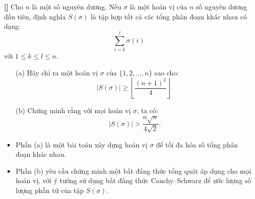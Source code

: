 \documentclass[../03-arithmetic-functions.tex]{subfiles}
\begin{document}
\begin{exercise*}\label{example:ROU-2015-TST-D4-P2}\textbf{[]}
    Cho \( n \) là một số nguyên dương. Nếu \( \sigma \) là một hoán vị của \( n \) số nguyên dương đầu tiên,
    định nghĩa \( S(\sigma) \) là tập hợp tất cả các tổng phân đoạn khác nhau có dạng:
    \[
        \sum_{i=k}^{l} \sigma(i)
    \]
    với \( 1 \le k \le l \le n \).
    
    \begin{itemize}[topsep=0pt, partopsep=0pt, itemsep=0pt]
        \item[(a)] Hãy chỉ ra một hoán vị \( \sigma \) của \( \{1, 2, \ldots, n\} \) sao cho:
        \[
            |S(\sigma)| \geq \left\lfloor \frac{(n+1)^2}{4} \right\rfloor.
        \]
        \item[(b)] Chứng minh rằng với mọi hoán vị \( \sigma \), ta có:
        \[
            |S(\sigma)| > \frac{n\sqrt{n}}{4\sqrt{2}}.
        \]
    \end{itemize}
\end{exercise*}

\begin{remark*}
    \begin{itemize}[topsep=0pt, partopsep=0pt, itemsep=0pt]
        \item Phần (a) là một bài toán xây dựng hoán vị \(\sigma\) để tối đa hóa số tổng phân đoạn khác nhau.
        \item Phần (b) yêu cầu chứng minh một bất đẳng thức tổng quát áp dụng cho mọi hoán vị, với ý tưởng sử dụng bất đẳng thức Cauchy–Schwarz để ước lượng số lượng phần tử của tập \( S(\sigma) \).
    \end{itemize}
\end{remark*}


\end{document}
